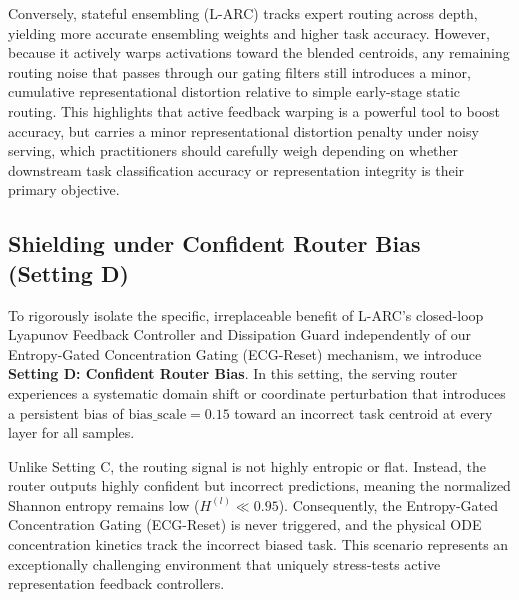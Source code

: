 Conversely, stateful ensembling (L-ARC) tracks expert routing across depth, yielding more accurate ensembling weights and higher task accuracy. However, because it actively warps activations toward the blended centroids, any remaining routing noise that passes through our gating filters still introduces a minor, cumulative representational distortion relative to simple early-stage static routing. This highlights that active feedback warping is a powerful tool to boost accuracy, but carries a minor representational distortion penalty under noisy serving, which practitioners should carefully weigh depending on whether downstream task classification accuracy or representation integrity is their primary objective.

\subsection{Shielding under Confident Router Bias (Setting D)}
\label{sec:router_bias}

To rigorously isolate the specific, irreplaceable benefit of L-ARC's closed-loop Lyapunov Feedback Controller and Dissipation Guard independently of our Entropy-Gated Concentration Gating (ECG-Reset) mechanism, we introduce \textbf{Setting D: Confident Router Bias}. In this setting, the serving router experiences a systematic domain shift or coordinate perturbation that introduces a persistent bias of $\text{bias\_scale} = 0.15$ toward an incorrect task centroid at every layer for all samples.

Unlike Setting C, the routing signal is not highly entropic or flat. Instead, the router outputs highly confident but incorrect predictions, meaning the normalized Shannon entropy remains low ($H^{(l)} \ll 0.95$). Consequently, the Entropy-Gated Concentration Gating (ECG-Reset) is never triggered, and the physical ODE concentration kinetics track the incorrect biased task. This scenario represents an exceptionally challenging environment that uniquely stress-tests active representation feedback controllers.

